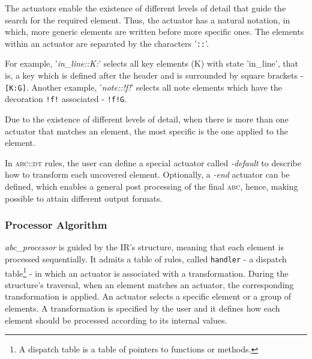 \documentclass[a4paper,UKenglish]{oasics}
\newcommand{\abc}{\textsc{abc}}
\newcommand{\abcdt}{\textsc{abc::dt}}
\newcommand{\abcprocessor}{\emph{abc\_processor}}
\newcommand{\awk}{\texttt{awk} }
\begin{document}
    The actuators enable the existence of different levels of detail that guide the search for the
    required element. Thus, the actuator has a natural notation, in which, more generic elements are
    written before more specific ones. The elements within an actuator are separated by the
    characters '\texttt{::}'.

    For example, '\textit{in\_line::K:}' selects all key elements (K) with state 'in\_line', that
    is, a key which is defined after the header and is surrounded by square brackets -
    \texttt{[K:G]}. Another example, '\textit{note::!f!}' selects all note elements which have the
    decoration \texttt{!f!} associated - \texttt{!f!G}.

    Due to the existence of different levels of detail, when there is more than one actuator that
    matches an element, the most specific is the one applied to the element.

    In \abcdt{} rules, the user can define a special actuator called \emph{-default} to describe how
    to transform each uncovered element. Optionally, a \emph{-end} actuator can be defined, which
    enables a general post processing of the final \abc{}, hence, making possible to attain
    different output formats.

\subsubsection{Processor Algorithm}

    \abcprocessor{} is guided by the IR's structure, meaning that each element is processed
    sequentially. It admits a table of rules, called \texttt{handler} - a dispatch table\footnote{A
    dispatch table is a table of pointers to functions or methods.} - in which an actuator is
    associated with a transformation. During the structure's traversal, when an element matches an
    actuator, the corresponding transformation is applied. An actuator selects a specific element or
    a group of elements. A transformation is specified by the user and it defines how each element
    should be processed according to its internal values.\\

\end{document}
